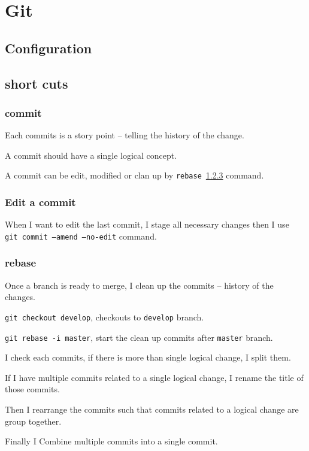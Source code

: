 \chapter{Git}

\section{Configuration}

\section{short cuts}

\subsection{commit}
Each commits is a story point -- telling the history of the change.

A commit should have a single logical concept.

A commit can be edit, modified or clan up by \texttt{rebase}~\ref{git_rebase} command.

\subsection{Edit a commit}
When I want to edit the last commit, I stage all necessary changes then I use \texttt{ git commit --amend --no-edit} command.


\subsection{rebase} \label{git_rebase}
Once a branch is ready to merge, I clean up the commits -- history of the changes. 


\texttt{git checkout develop}, checkouts to \texttt{develop} branch.

\texttt{git rebase -i master}, start the clean up commits after \texttt{master} branch.

I check each commits, if there is more than single logical change, I split them.

If I have multiple commits related to a single logical change, I rename the title of those commits.

Then I rearrange the commits such that commits related to a logical change are group together.

Finally I Combine multiple commits into a single commit.






